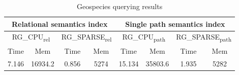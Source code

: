 {\setlength{\tabcolsep}{0.4em}
\begin{table*}[h]
\caption{Geospecies querying results}
\label{tbl:tableGeospeciesResults}
\begin{tabular}{| c  c | c  c | c  c | c  c |}
    \hline
    
    \multicolumn{4}{|c|}{Relational semantics index}	&	\multicolumn{4}{|c|}{Single path semantics index} \\    
    
    \hline
    
    
    \multicolumn{2}{|c|}{RG\_CPU\textsubscript{rel}}	&	\multicolumn{2}{|c|}{RG\_SPARSE\textsubscript{rel}} & \multicolumn{2}{|c|}{RG\_CPU\textsubscript{path}}	&	\multicolumn{2}{|c|}{RG\_SPARSE\textsubscript{path}}	 \\
     Time & Mem & Time & Mem & Time & Mem & Time & Mem \\    
    \hline
    \hline
    7.146 & 16934.2 & 0.856 & 5274 & 15.134 & 35803.6 & 1.935 & 5282   \\
    \hline
  \end{tabular}
\end{table*}
}

